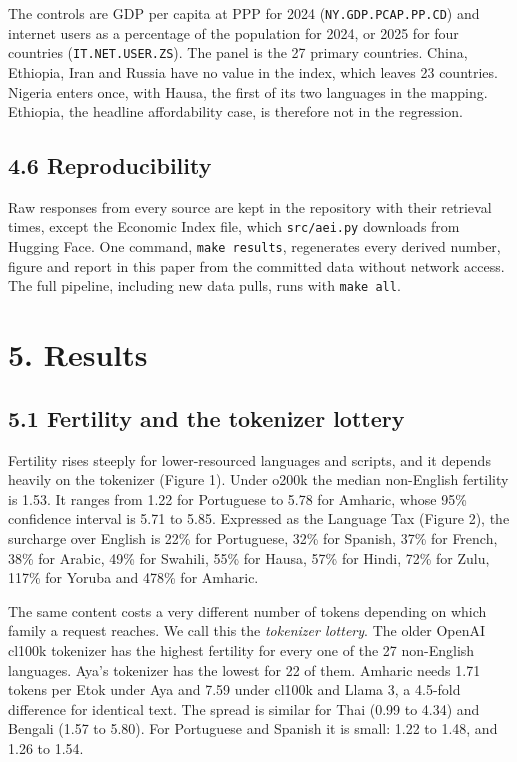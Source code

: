 \documentclass[11pt]{article}
\begin{document}
The controls are GDP per capita at PPP for 2024 (\texttt{NY.GDP.PCAP.PP.CD}) and internet users as a percentage of the population for 2024, or 2025 for four countries (\texttt{IT.NET.USER.ZS}). The panel is the 27 primary countries. China, Ethiopia, Iran and Russia have no value in the index, which leaves 23 countries. Nigeria enters once, with Hausa, the first of its two languages in the mapping. Ethiopia, the headline affordability case, is therefore not in the regression.

\subsection{4.6 Reproducibility}

Raw responses from every source are kept in the repository with their retrieval times, except the Economic Index file, which \texttt{src/aei.py} downloads from Hugging Face. One command, \texttt{make\ results}, regenerates every derived number, figure and report in this paper from the committed data without network access. The full pipeline, including new data pulls, runs with \texttt{make\ all}.

\section{5. Results}

\subsection{5.1 Fertility and the tokenizer lottery}

Fertility rises steeply for lower-resourced languages and scripts, and it depends heavily on the tokenizer (Figure 1). Under o200k the median non-English fertility is 1.53. It ranges from 1.22 for Portuguese to 5.78 for Amharic, whose 95\% confidence interval is 5.71 to 5.85. Expressed as the Language Tax (Figure 2), the surcharge over English is 22\% for Portuguese, 32\% for Spanish, 37\% for French, 38\% for Arabic, 49\% for Swahili, 55\% for Hausa, 57\% for Hindi, 72\% for Zulu, 117\% for Yoruba and 478\% for Amharic.

The same content costs a very different number of tokens depending on which family a request reaches. We call this the \emph{tokenizer lottery}. The older OpenAI cl100k tokenizer has the highest fertility for every one of the 27 non-English languages. Aya's tokenizer has the lowest for 22 of them. Amharic needs 1.71 tokens per Etok under Aya and 7.59 under cl100k and Llama 3, a 4.5-fold difference for identical text. The spread is similar for Thai (0.99 to 4.34) and Bengali (1.57 to 5.80). For Portuguese and Spanish it is small: 1.22 to 1.48, and 1.26 to 1.54.
\end{document}
